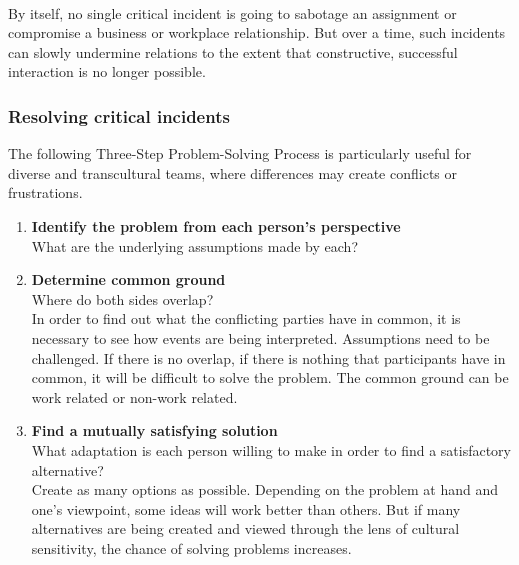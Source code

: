 \mbox{}\\
By itself, no single critical incident is going to sabotage an assignment or compromise a business or workplace relationship. But over a time, such incidents can slowly undermine relations to the extent that constructive, successful interaction is no longer possible.

\subsubsection{Resolving critical incidents}
The following Three-Step Problem-Solving Process is particularly useful for diverse and transcultural teams, where differences may create conflicts or frustrations.

\begin{enumerate}
	\item \textbf{Identify the problem from each person's perspective}\\
	What are the underlying assumptions made by each?
	\item \textbf{Determine common ground}\\
	Where do both sides overlap?\\
	In order to find out what the conflicting parties have in common, it is necessary to see how events are being interpreted. Assumptions need to be challenged. If there is no overlap, if there is nothing that participants have in common, it will be difficult to solve the problem. The common ground can be work related or non-work related.
	\item \textbf{Find a mutually satisfying solution}\\
	What adaptation is each person willing to make in order to find a satisfactory alternative?\\
	Create as many options as possible. Depending on the problem at hand and one’s viewpoint, some ideas will work better than others. But if many alternatives are being created and viewed through the lens of cultural sensitivity, the chance of solving problems increases.
\end{enumerate}
